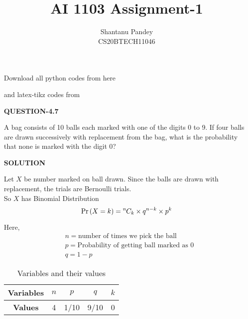 \documentclass[twocolumn]{article}
\title{AI 1103 Assignment-1}
\author{Shantanu Pandey\\ CS20BTECH11046}
\date{}
\providecommand{\pr}[1]{\ensuremath{\Pr\left(#1\right)}}
\newcommand*{\permcomb}[4][0mu]{{{}^{#3}\mkern#1#2_{#4}}}
\newcommand*{\comb}[1][-1mu]{\permcomb[#1]{C}}
\begin{document}
\maketitle
\noindent
Download all python codes from here

\noindent
{}
    
\vspace{0.3cm}
and latex-tikz codes from  

\vspace{0.3cm}  
    
   
\vspace{0.5cm}
\textbf{QUESTION-4.7}
\vspace{0.5cm} 

A bag consists of 10 balls each marked with
one of the digits 0 to 9. If four balls are drawn
successively with replacement from the bag,
what is the probability that none is marked
with the digit 0?

\vspace{0.5cm}
\textbf{SOLUTION}
\vspace{0.5cm} 



Let $X$ be number marked on ball drawn.
Since the balls are drawn with replacement, the trials are Bernoulli trials.
\\
So $X$ has Binomial Distribution 
\begin{equation}
    \pr {X=k}=\comb{n}{k} \times q^{n-k} \times p^{k} 
\end{equation} 

Here,
\begin{align}
& n = \text {number of times we pick the ball}  \\
& p= \text{Probability of getting ball marked as 0} \\
& q=1-p
\end{align}

\begin{table}[h!]
\centering

\begin{tabular}{|c|c|c|c|c|}
\hline
\textbf{Variables} & $n$ & $p$    & $q$    & $k$          \\ \hline
\textbf{Values}    & 4 & 1/10 & 9/10 & 0 \\ \hline
\end{tabular}
\caption{Variables and their values}
\label{table:1}
\end{table}
\end{document}
